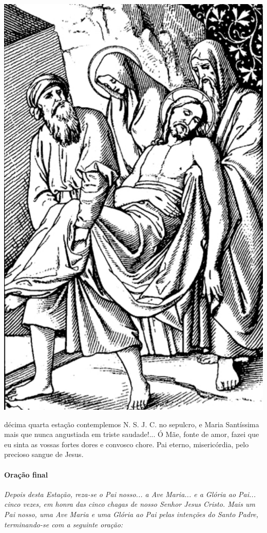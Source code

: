 \begin{nscenter}
\includegraphics[width=.8\textwidth, height=.8\textheight, keepaspectratio]{media/station14}
\end{nscenter}

 décima quarta estação contemplemos N. S. J. C. no sepulcro, e Maria Santíssima mais que nunca angustiada em triste saudade!...
Ó Mãe, fonte de amor, fazei que eu sinta as vossas fortes dores e convosco chore.
Pai eterno, misericórdia, pelo precioso sangue de Jesus.

\newpage

\paragraph{Oração final}

\emph{Depois desta Estação, reza-se o Pai nosso... a Ave Maria... e a Glória ao Pai... cinco vezes, em honra das cinco chagas de nosso Senhor Jesus Cristo. Mais um Pai nosso, uma Ave Maria e uma Glória ao Pai pelas intenções do Santo Padre, terminando-se com a seguinte oração:}

